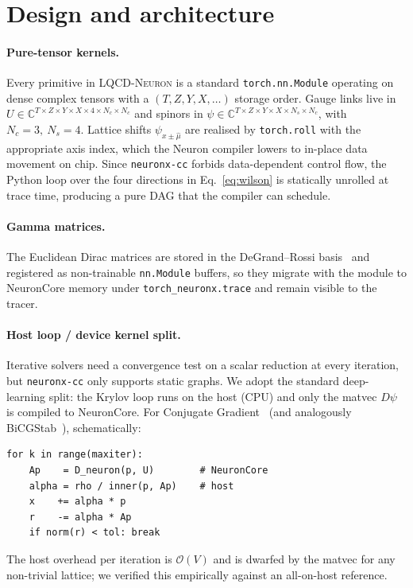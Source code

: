 \documentclass[a4paper,11pt]{article}
\begin{document}
\section{Design and architecture}
\label{sec:arch}

\paragraph*{Pure-tensor kernels.}
Every primitive in \textsc{LQCD-Neuron} is a standard
\texttt{torch.nn.Module} operating on dense complex tensors with a
$(T,Z,Y,X,\dots)$ storage order. Gauge links live in
$U\in\mathbb{C}^{T\times Z\times Y\times X\times 4\times N_c\times N_c}$
and spinors in $\psi\in\mathbb{C}^{T\times Z\times Y\times X\times N_s\times N_c}$,
with $N_c=3,\ N_s=4$. Lattice shifts $\psi_{x\pm\hat\mu}$ are
realised by \texttt{torch.roll} with the appropriate axis index, which
the Neuron compiler lowers to in-place data movement on chip. Since
\texttt{neuronx-cc} forbids data-dependent control flow, the
Python loop over the four directions in
Eq.~\eqref{eq:wilson} is statically unrolled at trace time, producing
a pure DAG that the compiler can schedule.

\paragraph*{Gamma matrices.}
The Euclidean Dirac matrices are stored in the DeGrand--Rossi
basis~\cite{DeGrandRossi} and registered as non-trainable
\texttt{nn.Module} buffers, so they migrate with the module to
NeuronCore memory under \texttt{torch\_neuronx.trace} and remain
visible to the tracer.

\paragraph*{Host loop / device kernel split.}
Iterative solvers need a convergence test on a scalar reduction at
every iteration, but \texttt{neuronx-cc} only supports static graphs.
We adopt the standard deep-learning split: the Krylov loop runs on the
host (CPU) and only the matvec $D\psi$ is compiled to NeuronCore.
For Conjugate Gradient~\cite{HestenesStiefel} (and analogously
BiCGStab~\cite{vanderVorst}), schematically:
\begin{lstlisting}
for k in range(maxiter):
    Ap    = D_neuron(p, U)        # NeuronCore
    alpha = rho / inner(p, Ap)    # host
    x    += alpha * p
    r    -= alpha * Ap
    if norm(r) < tol: break
\end{lstlisting}
The host overhead per iteration is $\mathcal{O}(V)$ and is dwarfed by
the matvec for any non-trivial lattice; we verified this empirically
against an all-on-host reference.
\end{document}
